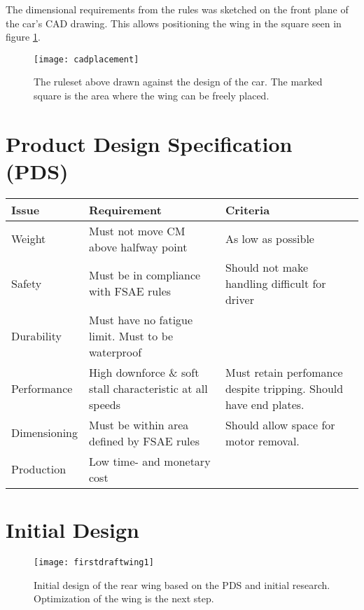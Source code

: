     The dimensional requirements from the rules was sketched on the front plane of the car's CAD drawing. This allows positioning the wing in the square seen in figure \ref{fig:cadplacement}.

    \begin{figure}
      \texttt{[image: cadplacement]}
      \caption{The ruleset above drawn against the design of the car. The marked square is the area where the wing can be freely placed.}
      \label{fig:cadplacement}
    \end{figure}

  \section{Product Design Specification (PDS)}
  \label{sec:PDS}
    \begin{tabularx}{\textwidth}[t]{>{\columncolor{seapurple!40}}l XX}
    \arrayrulecolor{seapurple}\hline
    \rowcolor{white}
    \textbf{\textcolor{seapurple}{Issue}} & \textbf{\textcolor{seapurple}{Requirement}} & \textbf{\textcolor{seapurple}{Criteria}}\\
    \hline
    Weight & Must not move CM above halfway point & As low as possible \\
    Safety & Must be in compliance with FSAE rules & Should not make handling difficult for driver\\
    Durability & Must have no fatigue limit. Must to be waterproof & \\
    Performance & High downforce \& soft stall characteristic at all speeds & Must retain perfomance despite tripping. Should have end plates.\\
    Dimensioning & Must be within area defined by FSAE rules & Should allow space for motor removal. \\
    Production & Low time- and monetary cost & \\
    \end{tabularx}

  \section{Initial Design}

    \begin{figure}
      \texttt{[image: firstdraftwing1]}
      \caption{Initial design of the rear wing based on the PDS and initial research. Optimization of the wing is the next step.}
      \label{fig:firstdraftwing}
    \end{figure}

